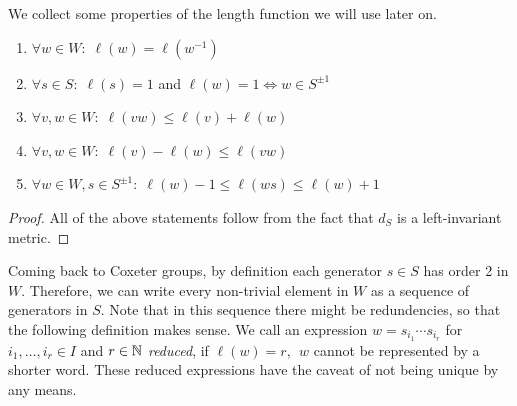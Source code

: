 \begin{lemma}
    We collect some properties of the length function we will use later on.
    \begin{enumerate}
        \item \(\forall w\in W:\; \ell(w) = \ell(w^{-1})\)
        \item \(\forall s\in S:\; \ell(s) = 1\) and \(\ell(w) = 1 \iff w\in S^{\pm 1}\)
        \item \(\forall v,w\in W:\; \ell(vw)\leq\ell(v)+\ell(w)\)
        \item \(\forall v,w\in W:\; \ell(v)-\ell(w)\leq\ell(vw)\)
        \item \(\forall w\in W, s\in S^{\pm 1}:\; \ell(w)-1\leq\ell(ws)\leq\ell(w)+1\)
    \end{enumerate}
\end{lemma}
\begin{proof}
    All of the above statements follow from the fact that \(d_S\) is a left-invariant metric.
\end{proof}

Coming back to Coxeter groups, by definition each generator \(s\in S\) has order 2 in \(W\).
Therefore, we can write every non-trivial element in \(W\) as a sequence of generators in \(S\).
Note that in this sequence there might be redundencies, so that the following definition makes sense. %
We call an expression \(w = s_{i_1} \cdots s_{i_r}\) for \(i_1,\ldots, i_r\in I\) and \(r\in\mathbb{N}\) \emph{reduced}, if \(\ell(w) = r\), \ie \(\;w\) cannot be represented by a shorter word.
These reduced expressions have the caveat of not being unique by any means.

